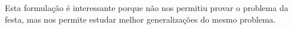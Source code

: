 Esta formulação é interessante porque não nos permitiu provar o problema da festa, mas nos permite estudar melhor generalizações do mesmo problema.












